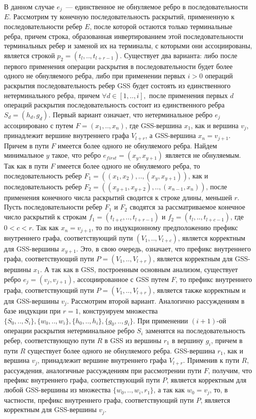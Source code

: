 В данном случае $e_{j}$~--- единственное не обнуляемое ребро в последовательности $E$. Рассмотрим ту конечную последовательность раскрытий, примененную к последовательности ребер $E$, после которой остаются только терминальные ребра, причем строка, образованная инвертированием этой последовательности терминальных ребер и заменой их на терминалы, с которыми они ассоциированы, является строкой $p_{2} = (t_{l},..,t_{l+r-1})$. Существует два варианта: либо после первого применения операции раскрытия в последовательности будет более одного не обнуляемого ребра, либо при применении первых $i > 0$ операций раскрытия последовательность ребер GSS будет состоять из единственного нетерминального ребра, причем $\forall d \in [1,..,i],$ после применения первых $d$ операций раскрытия последовательность состоит из единственного ребра $S_{d} = (h_{d}, g_{d})$. Первый вариант означает, что нетерминальное ребро $e_{j}$ ассоциировано с путем $F = (x_{1},..,x_{n})$, где GSS-вершина $x_{1}$, как и вершина $v_{j}$, принадлежит вершине внутреннего графа $V_{l+r}$, а GSS-вершина $x_{n} = v_{j+1}$. Причем в пути $F$ имеется более одного не обнуляемого ребра. Найдем минимальное $y$ такое, что ребро $e_{first} = (x_{y}, x_{y+1})$ является не обнуляемым. Так как в пути $F$ имеется более одного не обнуляемого ребра, то последовательность ребер $F_{1} = ((x_{1},x_{2}),..,(x_{y},x_{y+1}))$, как и последовательность ребер $F_{2} = ((x_{y+1},x_{y+2}),..,(x_{n-1},x_{n}))$, после применения конечного числа раскрытий сводится к строке длины, меньшей $r$. Пусть последовательности ребер $F_{1}$ и $F_{2}$ сводятся за рассматриваемое конечное число раскрытий к строкам $f_{1} = (t_{l+c},..,t_{l+r-1})$ и $f_{2} = (t_{l},..,t_{l+c-1})$, где $0 < c < r$. Так как $x_{n} = v_{j+1}$, то по индукционному предположению префикс внутреннего графа, соответствующий пути $(V_{1},..,V_{l+c})$, является корректным для GSS-вершины $x_{y+1}$. Это, в свою очередь, означает, что префикс внутреннего графа, соответствующий пути $P = (V_{1},..,V_{l+r})$, является корректным для GSS-вершины $x_{1}$. А так как в GSS, построенным основным анализом, существует ребро $e_{j} = (v_{j}, v_{j+1})$, ассоциированное с GSS путем $F$, то префикс внутреннего графа, соответствующий пути $P = (V_{1},..,V_{l+r})$, является также корректным и для GSS-вершины $v_{j}$. Рассмотрим второй вариант. Аналогично рассуждениям в базе индукции при $r = 1$, конструируем множества $\{S_{0},..,S_{i}\},\{w_{0},..,w_{i}\}, \{h_{0},..,h_{i}\}, \{g_{0},..,g_{i}\}$. При применении $(i+1)$-ой операции раскрытия нетерминальное ребро $S_{i}$ заменятся на последовательность ребер, соответствующую пути $R$ в GSS из вершины $r_{1}$ в вершину $g_{i}$, причем в пути $R$ существует более одного не обнуляемого ребра. GSS-вершина $r_{1}$, как и вершина $v_{j}$, принадлежит вершине внутреннего графа $V_{l+r}$. Применив к пути $R$, рассуждения, аналогичные рассуждениям при рассмотрении пути $F$, получим, что префикс внутреннего графа, соответствующий пути $P$, является корректным для любой GSS-вершины из множества $\{w_{0},..,w_{i},r_{1}\}$, а так как $w_{0} = v_{j}$, то, в частности, префикс внутреннего графа, соответствующий пути $P$, является корректным для GSS-вершины $v_{j}$.

